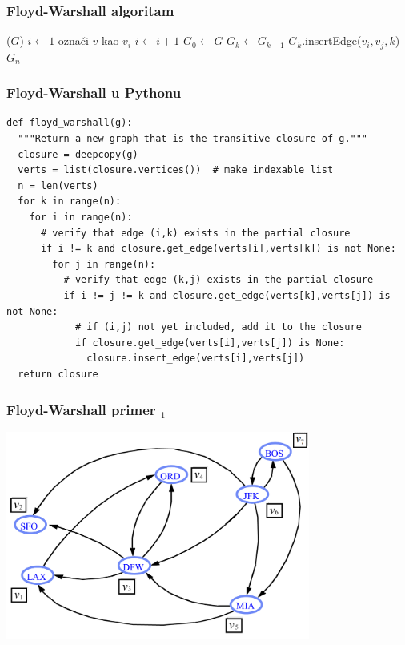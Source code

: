 \documentclass[compress]{beamer}
\begin{document}
\begin{frame}[fragile,shrink=10]
  \frametitle{Floyd-Warshall algoritam}
  \begin{algorithmic}
    \STATE {}($G$)
    \STATE $i \leftarrow 1$
      \STATE označi $v$ kao $v_{i}$
      \STATE $i \leftarrow i+1$
    \ENDFOR
    \STATE $G_{0} \leftarrow G$
      \STATE $G_{k} \leftarrow G_{k-1}$
              \STATE $G_{k}$.insertEdge($v_{i},v_{j},k$)
            \ENDIF
          \ENDIF
        \ENDFOR
      \ENDFOR
    \ENDFOR
    \RETURN $G_{n}$
  \end{algorithmic}
\end{frame}

\begin{frame}[fragile,shrink=23]
  \frametitle{Floyd-Warshall u Pythonu}
\begin{verbatim}
def floyd_warshall(g):
  """Return a new graph that is the transitive closure of g."""
  closure = deepcopy(g)
  verts = list(closure.vertices())  # make indexable list
  n = len(verts)
  for k in range(n):
    for i in range(n):
      # verify that edge (i,k) exists in the partial closure
      if i != k and closure.get_edge(verts[i],verts[k]) is not None:
        for j in range(n):
          # verify that edge (k,j) exists in the partial closure
          if i != j != k and closure.get_edge(verts[k],verts[j]) is not None:
            # if (i,j) not yet included, add it to the closure
            if closure.get_edge(verts[i],verts[j]) is None:
              closure.insert_edge(verts[i],verts[j])
  return closure
\end{verbatim}
\end{frame}

\begin{frame}[fragile]
  \frametitle{Floyd-Warshall primer $_1$}
  \begin{center}
    \includegraphics[width=10cm]{asp-14-pic37.png}
  \end{center}
\end{frame}
\end{document}
